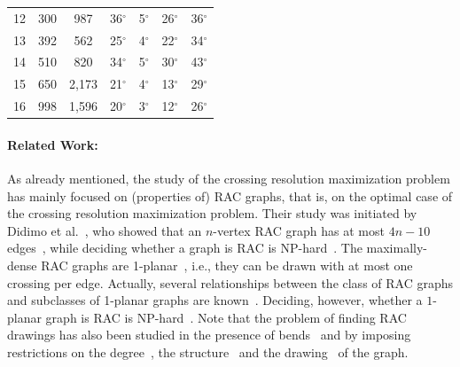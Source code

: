\documentclass{comjnl}
\begin{document}
\begin{table}
\begin{adjustbox}{width=1\textwidth}
\begin{tabular}{c|c|c|c|c|c|c}
\rowcolor{gray!00!} 12 & 300 & 987   & 36$^\circ$ & 5$^\circ$  & 26$^\circ$ & 36$^\circ$\\
\rowcolor{gray!30!} 13 & 392 & 562   & 25$^\circ$ & 4$^\circ$  & 22$^\circ$ & 34$^\circ$\\
\rowcolor{gray!00!} 14 & 510 & 820   & 34$^\circ$ & 5$^\circ$  & 30$^\circ$ & 43$^\circ$\\
\rowcolor{gray!30!} 15 & 650 & 2,173 & 21$^\circ$ & 4$^\circ$  & 13$^\circ$ & 29$^\circ$\\
\rowcolor{gray!00!} 16 & 998 & 1,596 & 20$^\circ$ & 3$^\circ$  & 12$^\circ$ & 26$^\circ$\\
\bottomrule
\end{tabular}
\end{adjustbox}
\label{tab:gdContest2017}
\end{table}

\paragraph{Related Work:}
As already mentioned, the study of the crossing resolution maximization problem has mainly focused on (properties of) RAC graphs, that is, on the optimal case of the crossing resolution maximization problem. Their study was initiated by Didimo et al.~\cite{DBLP:journals/tcs/DidimoEL11}, who showed that an $n$-vertex RAC graph has at most $4n-10$ edges~\cite{DBLP:journals/tcs/DidimoEL11}, while deciding whether a graph is RAC is NP-hard~\cite{DBLP:journals/jgaa/ArgyriouBS12}. The maximally-dense RAC graphs are 1-planar~\cite{DBLP:journals/dam/EadesL13}, i.e., they can be drawn with at most one crossing per edge. Actually, several relationships between the class of RAC graphs and subclasses of 1-planar graphs are known~\cite{DBLP:journals/dam/BachmaierBHNR17,DBLP:journals/tcs/BrandenburgDEKL16}. Deciding, however, whether a $1$-planar graph is RAC is NP-hard~\cite{DBLP:journals/tcs/BekosDLMM17}. Note that the problem of finding RAC drawings has also been studied in the presence of bends~\cite{DBLP:journals/jgaa/AngeliniCDFBKS11,DBLP:journals/comgeo/ArikushiFKMT12,DBLP:journals/tcs/DidimoEL11,DBLP:journals/mst/GiacomoDLM11} and by imposing restrictions on the degree~\cite{DBLP:conf/s-egc/AngeliniBDFHKLL11}, the structure~\cite{DBLP:journals/ipl/DidimoEL10} and the drawing~\cite{DBLP:journals/algorithmica/GiacomoDEL14,DBLP:conf/wg/HongN15} of the graph. 
\end{document}
